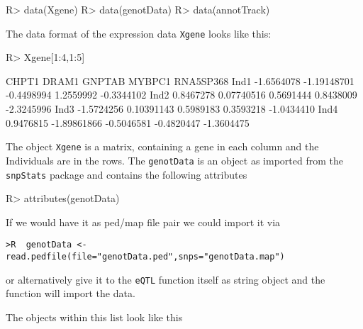 \documentclass[a4paper,10pt]{article}
\begin{document}
\begin{Schunk}
\begin{Sinput}
R> data(Xgene) 
R> data(genotData)
R> data(annotTrack)
\end{Sinput}
\end{Schunk}

The data format of the expression data \texttt{Xgene} looks like this:
\begin{Schunk}
\begin{Sinput}
R>    Xgene[1:4,1:5]
\end{Sinput}
\begin{Soutput}
          CHPT1       DRAM1     GNPTAB     MYBPC1  RNA5SP368
Ind1 -1.6564078 -1.19148701 -0.4498994  1.2559992 -0.3344102
Ind2  0.8467278  0.07740516  0.5691444  0.8438009 -2.3245996
Ind3 -1.5724256  0.10391143  0.5989183  0.3593218 -1.0434410
Ind4  0.9476815 -1.89861866 -0.5046581 -0.4820447 -1.3604475
\end{Soutput}
\end{Schunk}
The object \texttt{Xgene} is a matrix, containing a gene in each column and the Individuals are in the rows.
The \texttt{genotData} is an object as imported from the \texttt{snpStats} package and contains the following attributes
\begin{Schunk}
\begin{Sinput}
R> attributes(genotData)
\end{Sinput}
\end{Schunk}
If we would have it as ped/map file pair we could import it via

\begin{verbatim}
>R  genotData <- read.pedfile(file="genotData.ped",snps="genotData.map") 
\end{verbatim}

or alternatively give it to the \texttt{eQTL} function itself as string object and the function will import the data.

The objects within this list look like this
\end{document}
